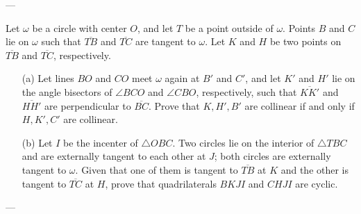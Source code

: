
---

Let $\omega$ be a circle with center $O$, and let $T$ be a point outside of $\omega$. Points $B$ and $C$ lie on $\omega$ such that $\overline{TB}$ and $\overline{TC}$ are tangent to $\omega$. Let $K$ and $H$ be two points on $\overline{TB}$ and $\overline{TC}$, respectively.
\begin{itemize}
    \item[(a)] Let lines $BO$ and $CO$ meet $\omega$ again at $B'$ and $C'$, and let $K'$ and $H'$ lie on the angle bisectors of $\angle BCO$ and $\angle CBO$, respectively, such that $\overline{KK'}$ and $\overline{HH'}$ are perpendicular to $\overline{BC}$. Prove that $K,H',B'$ are collinear if and only if $H,K',C'$ are collinear.
        \vspace{-0.5em}
    \item[(b)] Let $I$ be the incenter of $\triangle OBC$. Two circles lie on the interior of $\triangle TBC$ and are externally tangent to each other at $J$; both circles are externally tangent to $\omega$. Given that one of them is tangent to $\overline{TB}$ at $K$ and the other is tangent to $\overline{TC}$ at $H$, prove that quadrilaterals $BKJI$ and $CHJI$ are cyclic.
\end{itemize}

---

